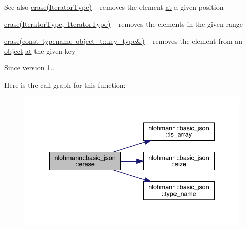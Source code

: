 \begin{DoxySeeAlso}{See also}
\mbox{\hyperlink{classnlohmann_1_1basic__json_a068a16e76be178e83da6a192916923ed}{erase(\+Iterator\+Type)}} -- removes the element \mbox{\hyperlink{classnlohmann_1_1basic__json_a73ae333487310e3302135189ce8ff5d8}{at}} a given position 

\mbox{\hyperlink{classnlohmann_1_1basic__json_a4b3f7eb2d4625d95a51fbbdceb7c5f39}{erase(\+Iterator\+Type, Iterator\+Type)}} -- removes the elements in the given range 

\mbox{\hyperlink{classnlohmann_1_1basic__json_a2f8484d69c55d8f2a9697a7bec29362a}{erase(const typename object\+\_\+t\+::key\+\_\+type\&)}} -- removes the element from an \mbox{\hyperlink{classnlohmann_1_1basic__json_a9f42ee7d10eee2d5a73fd94ca7f767ca}{object}} \mbox{\hyperlink{classnlohmann_1_1basic__json_a73ae333487310e3302135189ce8ff5d8}{at}} the given key
\end{DoxySeeAlso}
\begin{DoxySince}{Since}
version 1.. 
\end{DoxySince}
Here is the call graph for this function\+:\nopagebreak
\begin{figure}[H]
\begin{center}
\leavevmode
\includegraphics[width=341pt]{classnlohmann_1_1basic__json_a88cbcefe9a3f4d294bed0653550a5cb9_cgraph}
\end{center}
\end{figure}
\mbox{\label{classnlohmann_1_1basic__json_aeed33787bd362c7ead59a4ba945392db}} 
